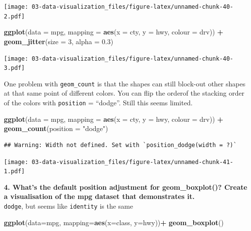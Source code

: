 \documentclass[]{book}
\newenvironment{Shaded}{\begin{snugshade}}{\end{snugshade}}
\newcommand{\DataTypeTok}[1]{\textcolor[rgb]{0.13,0.29,0.53}{#1}}
\newcommand{\DecValTok}[1]{\textcolor[rgb]{0.00,0.00,0.81}{#1}}
\newcommand{\FloatTok}[1]{\textcolor[rgb]{0.00,0.00,0.81}{#1}}
\newcommand{\KeywordTok}[1]{\textcolor[rgb]{0.13,0.29,0.53}{\textbf{#1}}}
\newcommand{\NormalTok}[1]{#1}
\newcommand{\OperatorTok}[1]{\textcolor[rgb]{0.81,0.36,0.00}{\textbf{#1}}}
\newcommand{\StringTok}[1]{\textcolor[rgb]{0.31,0.60,0.02}{#1}}
\theoremstyle{definition}
\theoremstyle{definition}
\theoremstyle{definition}
\theoremstyle{remark}
\begin{document}
\texttt{[image: 03-data-visualization\_files/figure-latex/unnamed-chunk-40-2.pdf]}

\begin{Shaded}
\begin{Highlighting}[]
\KeywordTok{ggplot}\NormalTok{(}\DataTypeTok{data =}\NormalTok{ mpg, }\DataTypeTok{mapping =} \KeywordTok{aes}\NormalTok{(}\DataTypeTok{x =}\NormalTok{ cty, }\DataTypeTok{y =}\NormalTok{ hwy, }\DataTypeTok{colour =}\NormalTok{ drv)) }\OperatorTok{+}\StringTok{ }
\StringTok{  }\KeywordTok{geom_jitter}\NormalTok{(}\DataTypeTok{size =} \DecValTok{3}\NormalTok{, }\DataTypeTok{alpha =} \FloatTok{0.3}\NormalTok{)}
\end{Highlighting}
\end{Shaded}

\texttt{[image: 03-data-visualization\_files/figure-latex/unnamed-chunk-40-3.pdf]}

One problem with \texttt{geom\_count} is that the shapes can still
block-out other shapes at that same point of different colors. You can
flip the orderof the stacking order of the colors with \texttt{position}
= ``dodge''. Still this seems limited.

\begin{Shaded}
\begin{Highlighting}[]
\KeywordTok{ggplot}\NormalTok{(}\DataTypeTok{data =}\NormalTok{ mpg, }\DataTypeTok{mapping =} \KeywordTok{aes}\NormalTok{(}\DataTypeTok{x =}\NormalTok{ cty, }\DataTypeTok{y =}\NormalTok{ hwy, }\DataTypeTok{colour =}\NormalTok{ drv)) }\OperatorTok{+}\StringTok{ }
\StringTok{  }\KeywordTok{geom_count}\NormalTok{(}\DataTypeTok{position =} \StringTok{"dodge"}\NormalTok{)}
\end{Highlighting}
\end{Shaded}

\begin{verbatim}
## Warning: Width not defined. Set with `position_dodge(width = ?)`
\end{verbatim}

\texttt{[image: 03-data-visualization\_files/figure-latex/unnamed-chunk-41-1.pdf]}

\textbf{4. What's the default position adjustment for geom\_boxplot()?
Create a visualisation of the mpg dataset that demonstrates it.}\\
\texttt{dodge}, but seems like \texttt{identity} is the same

\begin{Shaded}
\begin{Highlighting}[]
\KeywordTok{ggplot}\NormalTok{(}\DataTypeTok{data=}\NormalTok{mpg, }\DataTypeTok{mapping=}\KeywordTok{aes}\NormalTok{(}\DataTypeTok{x=}\NormalTok{class, }\DataTypeTok{y=}\NormalTok{hwy))}\OperatorTok{+}
\StringTok{  }\KeywordTok{geom_boxplot}\NormalTok{()}
\end{Highlighting}
\end{Shaded}
\end{document}
